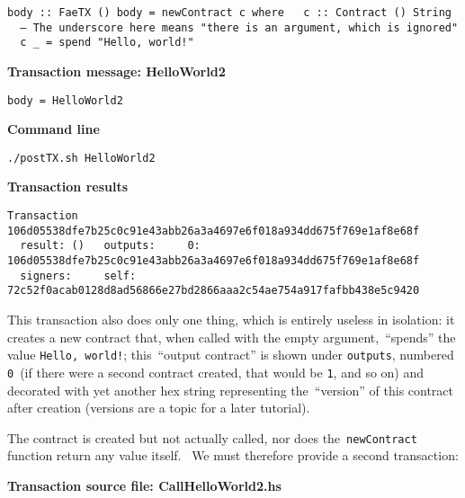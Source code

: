 \documentclass[11pt]{article}
\newcommand{\codeblock}[1]{\begin{mdframed}[
    backgroundcolor=header-color,
    linecolor=header-color,
    innertopmargin=10pt,
    ]{\texttt{#1}}\end{mdframed}}
\begin{document}
\codeblock{body :: FaeTX ()\newline
body = newContract c where\newline
  c :: Contract () String\newline
  -- The underscore here means "there is an argument, which is ignored"\newline
  c \_ = spend "Hello, world!"}

\textbf{Transaction message: HelloWorld2}

\codeblock{body = HelloWorld2}

\textbf{Command line}

\codeblock{.\slash{}postTX.sh HelloWorld2}

\textbf{Transaction results}

\codeblock{Transaction 106d05538dfe7b25c0c91e43abb26a3a4697e6f018a934dd675f769e1af8e68f\newline
  result: ()\newline
  outputs:\newline
    0: 106d05538dfe7b25c0c91e43abb26a3a4697e6f018a934dd675f769e1af8e68f\newline
  signers:\newline
    self: 72c52f0acab0128d8ad56866e27bd2866aaa2c54ae754a917fafbb438e5c9420}

This transaction also does only one thing, which is entirely useless in isolation: it creates a new contract that, when called with the empty argument, “spends” the value \texttt{Hello, world!}; this “output contract” is shown under \texttt{outputs}, numbered \texttt{0} (if there were a second contract created, that would be \texttt{1}, and so on) and decorated with yet another hex string representing the “version” of this contract after creation (versions are a topic for a later tutorial). 


\vspace{11pt}

The contract is created but not actually called, nor does the \texttt{newContract} function return any value itself.  We must therefore provide a second transaction:


\vspace{11pt}

\textbf{Transaction source file: CallHelloWorld2.hs}
\end{document}
